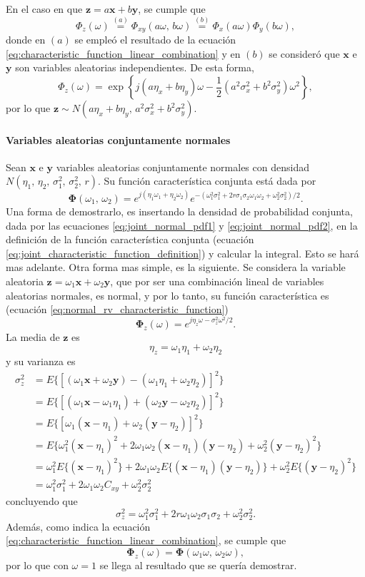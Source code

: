 \documentclass[a4paper]{report}
\newcommand{\x}{\mathbf{x}}
\newcommand{\y}{\mathbf{y}}
\newcommand{\z}{\mathbf{z}}
\newcommand{\Phibf}{\mathbf{\Phi}}
\begin{document}
En el caso en que \(\z=a\x+b\y\), se cumple que
\[
 \Phi_z(\omega)\overset{(a)}{=}\Phi_{xy}(a\omega,\,b\omega)\overset{(b)}{=}\Phi_x(a\omega)\Phi_y(b\omega),
\]
donde en \((a)\) se empleó el resultado de la ecuación \ref{eq:characteristic_function_linear_combination} y en \((b)\) se consideró que \(\x\) e \(\y\) son variables aleatorias independientes. De esta forma,
\[
 \Phi_z(\omega)=\exp\left\{j(a\eta_x+b\eta_y)\omega-\frac{1}{2}(a^2\sigma_x^2+b^2\sigma_y^2)\omega^2\right\},
\]
por lo que \(\z\sim N(a\eta_x+b\eta_y,\,a^2\sigma_x^2+b^2\sigma_y^2)\).



\paragraph{Variables aleatorias conjuntamente normales}
Sean \(\x\) e \(\y\) variables aleatorias conjuntamente normales con densidad \(N(\eta_1,\,\eta_2,\,\sigma_1^2,\,\sigma_2^2,\,r)\). Su función característica conjunta está dada por
\begin{equation}\label{eq:characteristic_function_jointly_normal}
 \Phibf(\omega_1,\,\omega_2)=e^{j(\eta_1\omega_1+\eta_2\omega_2)}e^{-(\omega_1^2\sigma_1^2+2r\sigma_1\sigma_2\omega_1\omega_2+\omega_2^2\sigma_2^2)/2}.
\end{equation}
Una forma de demostrarlo, es insertando la densidad de probabilidad conjunta, dada por las ecuaciones \ref{eq:joint_normal_pdf1} y \ref{eq:joint_normal_pdf2}, en la definición de la función característica conjunta (ecuación \ref{eq:joint_characteristic_function_definition}) y calcular la integral. Esto se hará mas adelante. Otra forma mas simple, es la siguiente. Se considera la variable aleatoria \(\z=\omega_1\x+\omega_2\y\), que por ser una combinación lineal de variables aleatorias normales, es normal, y por lo tanto, su función característica es (ecuación \ref{eq:normal_rv_characteristic_function})
\[
 \Phibf_z(\omega)=e^{j\eta_z\omega-\sigma_z^2\omega^2/2}.
\]
La media de \(\z\) es
\[
 \eta_z=\omega_1\eta_1+\omega_2\eta_2
\]
y su varianza es
\begin{align*}
\sigma_z^2&=E\{\left[(\omega_1\x+\omega_2\y)-(\omega_1\eta_1+\omega_2\eta_2)\right]^2\}\\
  &=E\{\left[(\omega_1\x-\omega_1\eta_1)+(\omega_2\y-\omega_2\eta_2)\right]^2\}\\
  &=E\{\left[\omega_1(\x-\eta_1)+\omega_2(\y-\eta_2)\right]^2\}\\
  &=E\{\omega_1^2(\x-\eta_1)^2+2\omega_1\omega_2(\x-\eta_1)(\y-\eta_2)+\omega_2^2(\y-\eta_2)^2\}\\
  &=\omega_1^2E\{(\x-\eta_1)^2\}+2\omega_1\omega_2E\{(\x-\eta_1)(\y-\eta_2)\}+\omega_2^2E\{(\y-\eta_2)^2\}\\
  &=\omega_1^2\sigma_1^2+2\omega_1\omega_2C_{xy}+\omega_2^2\sigma_2^2
\end{align*}
concluyendo que
\[
 \sigma_z^2=\omega_1^2\sigma_1^2+2r\omega_1\omega_2\sigma_1\sigma_2+\omega_2^2\sigma_2^2.
\]
Además, como indica la ecuación \ref{eq:characteristic_function_linear_combination}, se cumple que
\[
 \Phibf_z(\omega)=\Phibf(\omega_1\omega,\,\omega_2\omega),
\]
por lo que con \(\omega=1\) se llega al resultado que se quería demostrar.
\end{document}
